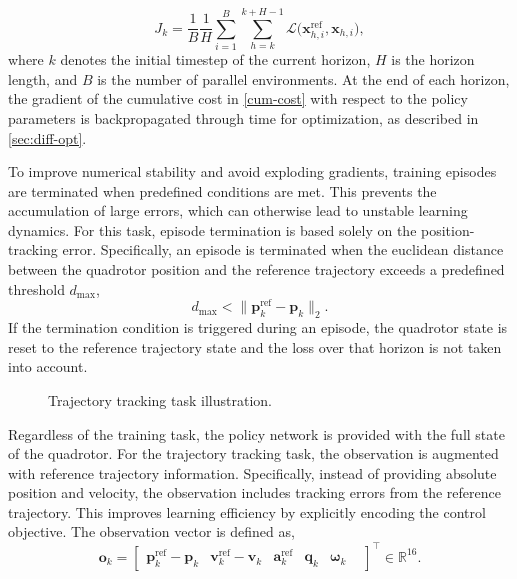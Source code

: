 \begin{equation}\label{cum-cost}
J_k = \frac{1}{B}\frac{1}{H} \sum_{i=1}^{B} \sum_{h=k}^{k+H-1} \mathcal{L}\big(\mathbf{x}_{h,i}^\text{ref}, \mathbf{x}_{h,i}\big),
\end{equation}
where $k$ denotes the initial timestep of the current horizon, $H$ is the horizon length, and $B$ is the number of parallel environments.
At the end of each horizon, the gradient of the cumulative cost in \eqref{cum-cost} with respect to the policy parameters is backpropagated through time for optimization, as described in \autoref{sec:diff-opt}.

To improve numerical stability and avoid exploding gradients, training episodes are terminated when predefined conditions are met.
This prevents the accumulation of large errors, which can otherwise lead to unstable learning dynamics.
For this task, episode termination is based solely on the position-tracking error.
Specifically, an episode is terminated when the euclidean distance between the quadrotor position and the reference trajectory exceeds a predefined threshold $d_{\max}$,
\begin{equation}
d_{\max} < \|\mathbf{p}_k^\text{ref} - \mathbf{p}_k\|_2. 
\end{equation}
If the termination condition is triggered during an episode, the quadrotor state is reset to the reference trajectory state and the loss over that horizon is not taken into account.

\begin{figure}[H]
    \centering
    
    \caption{Trajectory tracking task illustration.}
    \label{tt-task}
\end{figure}



Regardless of the training task, the policy network is provided with the full state of the quadrotor.
For the trajectory tracking task, the observation is augmented with reference trajectory information.
Specifically, instead of providing absolute position and velocity, the observation includes tracking errors from the reference trajectory.
This improves learning efficiency by explicitly encoding the control objective.
The observation vector is defined as,
\begin{equation}\label{obs-TT}
\mathbf{o}_k =
\begin{bmatrix}
\mathbf{p}_k^\text{ref} - \mathbf{p}_k & 
\mathbf{v}_k^\text{ref} - \mathbf{v}_k & 
\mathbf{a}_k^\text{ref} &
\mathbf{q}_k &
\boldsymbol{\omega}_k &
\end{bmatrix}^\top
\in \mathbb{R}^{16}.
\end{equation}

